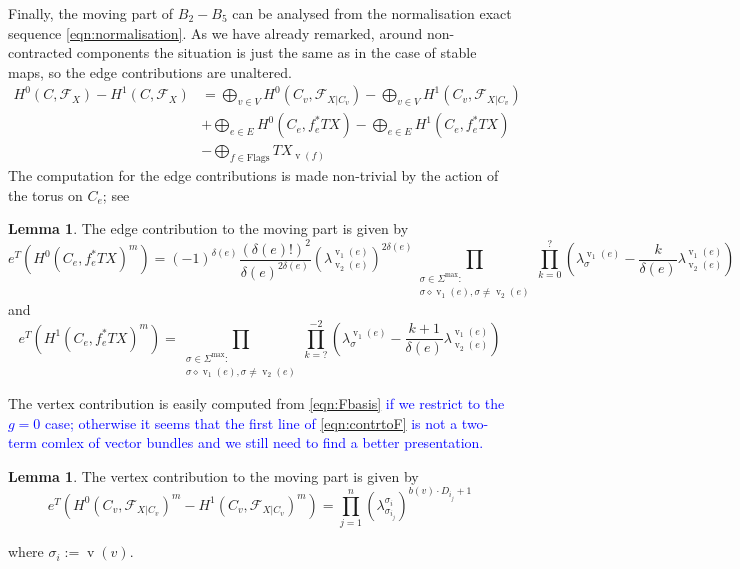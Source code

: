 \documentclass[11pt]{amsart}
\newcommand{\F}{\mathcal F}
\newcommand{\vv}{\operatorname{v}}
\theoremstyle{definition}
\newtheorem{lem}[thm]{Lemma}
\theoremstyle{definition}
\begin{document}
Finally, the moving part of $B_2-B_5$ can be analysed from the normalisation exact sequence \eqref{eqn:normalisation}. As we have already remarked, around non-contracted components the situation is just the same as in the case of stable maps, so the edge contributions are unaltered.
\begin{equation}\label{eqn:contrtoF}
\begin{aligned}
 H^0(C,\F_X)-H^1(C,\F_X) &= \bigoplus_{v\in V}H^0(C_v,\F_{X|C_v})-\bigoplus_{v\in V}H^1(C_v,\F_{X|C_v}) \\
 & + \bigoplus_{e\in E}H^0(C_e,f_e^*TX)-\bigoplus_{e\in E}H^1(C_e,f_e^*TX) \\
 & - \bigoplus_{f\in\text{Flags}} TX_{\vv(f)}
\end{aligned} 
\end{equation}
The computation for the edge contributions is made non-trivial by the action of the torus on $C_e$; see \cite[Lemma 7.4 and Corollary 7.5]{HolgerSpielberg}
\begin{lem}
The edge contribution to the moving part is given by
\[
 e^T(H^0(C_e,f_e^*TX)^m)=(-1)^{\delta(e)}\frac{(\delta(e)!)^2}{\delta(e)^{2\delta(e)}}(\lambda^{\vv_1(e)}_{\vv_2(e)})^{2\delta(e)}\prod_{\substack{\sigma\in\Sigma^{\text{max}}: \\ \sigma\diamond\vv_1(e),\sigma\neq\vv_2(e)}}\prod_{k=0}^{?}(\lambda^{\vv_1(e)}_{\sigma}-\frac{k}{\delta(e)}\lambda^{\vv_1(e)}_{\vv_2(e)})
\]
and
\[
 e^T(H^1(C_e,f_e^*TX)^m)=\prod_{\substack{\sigma\in\Sigma^{\text{max}}: \\ \sigma\diamond\vv_1(e),\sigma\neq\vv_2(e)}}\prod_{k=?}^{-2}(\lambda^{\vv_1(e)}_{\sigma}-\frac{k+1}{\delta(e)}\lambda^{\vv_1(e)}_{\vv_2(e)})
\]
\end{lem}

The vertex contribution is easily computed from \eqref{eqn:Fbasis} \textcolor{blue}{if we restrict to the $g=0$ case; otherwise it seems that the first line of \eqref{eqn:contrtoF} is not a two-term comlex of vector bundles and we still need to find a better presentation.}

\begin{lem}
 The vertex contribution to the moving part is given by
 \[
  e^T(H^0(C_v,\F_{X|C_v})^m-H^1(C_v,\F_{X|C_v})^m)=\prod_{j=1}^n(\lambda^{\sigma_i}_{\sigma_{i_j}})^{b(v)\cdot D_{i_j}+1}
 \]
 
where $\sigma_i:=\vv(v)$.
\end{lem}
\end{document}
